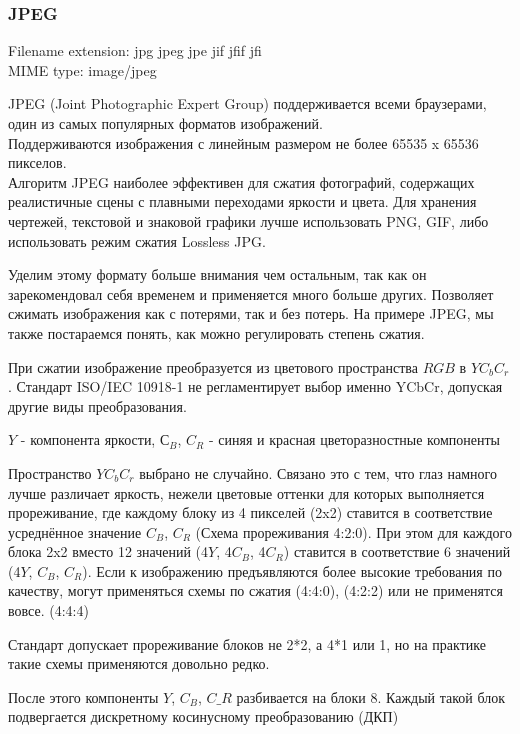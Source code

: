\documentclass[12pt]{article}
\begin{document}
\subsubsection{JPEG}

Filename extension: jpg jpeg jpe jif jfif jfi \\
MIME type: image/jpeg

JPEG (Joint Photographic Expert Group) поддерживается всеми браузерами,
один из самых популярных форматов изображений. \\
Поддерживаются изображения с линейным размером не более 65535 x 65536 пикселов. \\

Алгоритм JPEG наиболее эффективен для сжатия фотографий, содержащих реалистичные сцены
с плавными переходами яркости и цвета. Для хранения чертежей, текстовой и знаковой
графики лучше использовать PNG, GIF,
либо использовать режим сжатия Lossless JPG.

Уделим этому формату больше внимания чем остальным, так как он зарекомендовал себя временем
и применяется много больше других. Позволяет сжимать изображения как с потерями,
так и без потерь.
На примере JPEG, мы также постараемся понять, как можно регулировать степень сжатия.

При сжатии изображение преобразуется из цветового пространства $RGB$ в $YC_{b}C_{r}$.
Стандарт ISO/IEC 10918-1 не регламентирует выбор именно YCbCr,
допуская другие виды преобразования.

$Y$ - компонента яркости, $С_{B}$, $C_{R}$ - синяя и красная цветоразностные компоненты

Пространство $YC_{b}C_{r}$  выбрано не случайно. Связано это с тем, что глаз намного лучше различает
яркость, нежели цветовые оттенки для которых выполняется прореживание, где каждому блоку
из 4 пикселей (2x2) ставится в соответствие усреднённое значение $C_{B}$, $C_{R}$ (Схема прореживания 4:2:0).
При этом для каждого блока 2x2 вместо 12 значений (4$Y$, 4$C_{B}$, 4$C_{R}$)
ставится в соответствие 6 значений (4$Y$, $C_{B}$, $C_{R}$). Если к изображению предъявляются более высокие
требования по качеству, могут применяться схемы по сжатия (4:4:0), (4:2:2)
или не применятся вовсе. (4:4:4)

Стандарт допускает прореживание блоков не 2*2, а 4*1 или 1,
но на практике такие схемы применяются довольно редко.

После этого компоненты $Y$, $C_{B}$, $C\_{R}$ разбивается на блоки 8.
Каждый такой блок подвергается дискретному косинусному преобразованию (ДКП)
\end{document}
